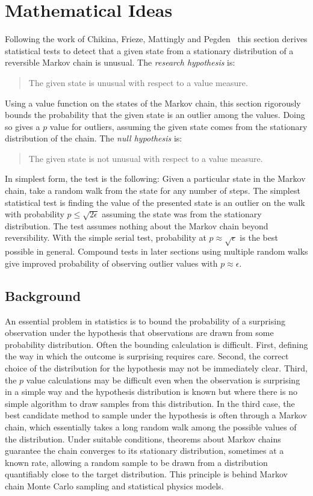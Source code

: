 \documentclass[12pt]{article}
\begin{document}
\section*{Mathematical Ideas}

Following the work of Chikina, Frieze, Mattingly and Pegden~%
\cite{doi:10.1080/2330443X.2020.1806763, Chikina2860, Chikina2019} this
section derives statistical tests to detect that a given state from a
stationary distribution of a reversible Markov chain is unusual.  The
\emph{research hypothesis} is:
\begin{quote}
    The given state is unusual with respect to a value measure.
\end{quote}
Using a value function on the states of the Markov chain, this section
rigorously bounds the probability that the given state is an outlier
among the values.  Doing so gives a \( p \) value for outliers, assuming
the given state comes from the stationary distribution of the chain.
The \emph{null hypothesis} is:
\begin{quote}
    The given state is not unusual with respect to a value measure.
\end{quote}

In simplest form, the test is the following:  Given a particular state
in the Markov chain, take a random walk from the state for any number of
steps.  The simplest statistical test is finding the value of the
presented state is an outlier on the walk with
probability \( p \le \sqrt{2\epsilon} \) assuming the state was from the
stationary distribution.  The test assumes nothing about the Markov
chain beyond reversibility.  With the simple serial test, probability at
\( p \approx \sqrt{\epsilon} \) is the best possible in general.
Compound tests in later sections using multiple random walks give
improved probability of observing outlier values with \( p \approx
\epsilon \).

\subsection*{Background}

An essential problem in statistics is to bound the probability of a
surprising observation under the hypothesis that observations are drawn
from some probability distribution.  Often the bounding calculation is
difficult.  First, defining the way in which the outcome is surprising
requires care.  Second, the correct choice of the distribution for
the hypothesis may not be immediately clear.  Third, the \( p \)
value calculations may be difficult even when the observation is
surprising in a simple way and the hypothesis distribution is known but
where there is no simple algorithm to draw samples from this
distribution.  In the third case, the best candidate method to sample
under the hypothesis is often through a Markov chain, which essentially
takes a long random walk among the possible values of the distribution.
Under suitable conditions, theorems about Markov chains guarantee the
chain converges to its stationary distribution, sometimes at a known
rate, allowing a random sample to be drawn from a distribution
quantifiably close to the target distribution.  This principle is behind
Markov chain Monte Carlo sampling and statistical physics models.
\end{document}
